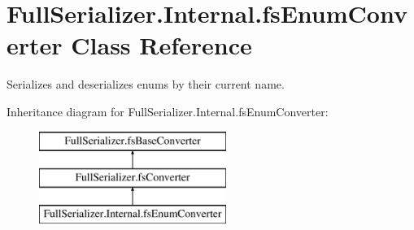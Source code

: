\hypertarget{class_full_serializer_1_1_internal_1_1fs_enum_converter}{}\section{Full\+Serializer.\+Internal.\+fs\+Enum\+Converter Class Reference}
\label{class_full_serializer_1_1_internal_1_1fs_enum_converter}


Serializes and deserializes enums by their current name.  


Inheritance diagram for Full\+Serializer.\+Internal.\+fs\+Enum\+Converter\+:\begin{figure}[H]
\begin{center}
\leavevmode
\includegraphics[height=3.000000cm]{class_full_serializer_1_1_internal_1_1fs_enum_converter}
\end{center}
\end{figure}
